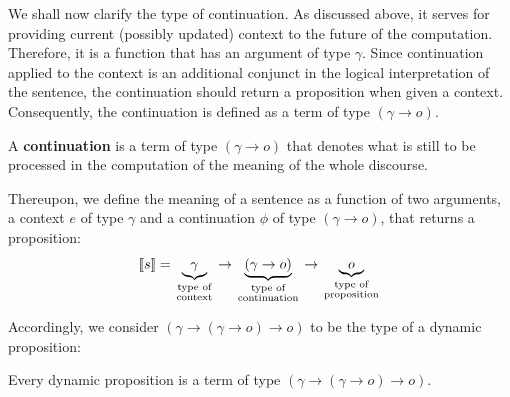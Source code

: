  We shall now clarify the type of continuation. As discussed above, it serves for providing current (possibly updated) context to the future of the computation. Therefore, it is a function that has an argument of type $\gamma$. Since continuation applied to the context is an additional conjunct in the logical interpretation of the sentence, the continuation should return a proposition when given a context. Consequently, the continuation is defined as a term of type $(\gamma \rightarrow o)$.


\begin{definition}[Continuation] A \textbf{continuation} is a term of type $(\gamma \rightarrow o)$ that denotes what is still to be processed in the computation of the meaning of the whole discourse. 
\end{definition}

 Thereupon, we define the meaning of a sentence as a function of two arguments, a context $e$ of type $\gamma$ and a continuation $\phi$ of type $(\gamma \rightarrow o)$, that returns a proposition:
\begin{align}
[\![s]\!] = \underbrace{\gamma}_{\begin{smallmatrix}
\text{type of}\\
\text{context}
\end{smallmatrix}} \rightarrow \underbrace{(\gamma \rightarrow o)}_{\begin{smallmatrix}
\text{type of}\\
\text{continuation}
\end{smallmatrix}} \rightarrow \underbrace{o}_{
\begin{smallmatrix}
\text{type of}\\
\text{proposition}
\end{smallmatrix}} \notag
\end{align}

Accordingly, we consider $(\gamma \rightarrow (\gamma \rightarrow o) \rightarrow o)$ to be the type of a dynamic proposition:
\begin{definition} Every dynamic proposition is a term of type $(\gamma \rightarrow (\gamma \rightarrow o) \rightarrow o)$.
\end{definition}


